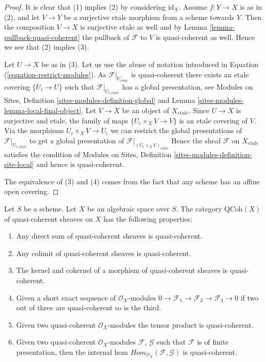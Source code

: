 \begin{proof}
It is clear that (1) implies (2) by considering $\text{id}_X$.
Assume $f : Y \to X$ is as in (2), and let $V \to Y$ be a surjective
etale morphism from a scheme towards $Y$. Then the composition $V \to X$ is
surjective etale as well
and by Lemma \ref{lemma-pullback-quasi-coherent} the pullback of $\mathcal{F}$
to $V$ is quasi-coherent as well. Hence we see that (2) implies (3).

\medskip\noindent
Let $U \to X$ be as in (3). Let us use the abuse of notation introduced
in Equation (\ref{equation-restrict-modules}).
As $\mathcal{F}|_{U_{etale}}$ is quasi-coherent there exists an etale covering
$\{U_i \to U\}$ such that $\mathcal{F}|_{U_{i, etale}}$ has a
global presentation, see
Modules on Sites, Definition \ref{sites-modules-definition-global} and
Lemma \ref{sites-modules-lemma-local-final-object}.
Let $V \to X$ be an object of $X_{etale}$. Since $U \to X$ is surjective and
etale, the family of maps $\{U_i \times_X V \to V\}$ is an etale covering
of $V$. Via the morphisms $U_i \times_X V \to U_i$ we can restrict the
global presentations of $\mathcal{F}|_{U_{i, etale}}$ to get a global
presentation of $\mathcal{F}|_{(U_i \times_X V)_{etale}}$
Hence the sheaf $\mathcal{F}$ on $X_{etale}$ satisfies the condition of
Modules on Sites, Definition \ref{sites-modules-definition-site-local}
and hence is quasi-coherent.

\medskip\noindent
The equivalence of (3) and (4) comes from the fact that any scheme has
an affine open covering.
\end{proof}

\begin{lemma}
\label{lemma-properties-quasi-coherent}
Let $S$ be a scheme. Let $X$ be an algebraic space over $S$.
The category $\text{QCoh}(X)$ of quasi-coherent sheaves on $X$ has
the following properties:
\begin{enumerate}
\item Any direct sum of quasi-coherent sheaves is quasi-coherent.
\item Any colimit of quasi-coherent sheaves is quasi-coherent.
\item The kernel and cokernel of a morphism of quasi-coherent sheaves
is quasi-coherent.
\item Given a short exact sequence of $\mathcal{O}_X$-modules
$0 \to \mathcal{F}_1 \to \mathcal{F}_2 \to \mathcal{F}_3 \to 0$
if two out of three are quasi-coherent so is the third.
\item Given two quasi-coherent $\mathcal{O}_X$-modules
the tensor product is quasi-coherent.
\item Given two quasi-coherent $\mathcal{O}_X$-modules
$\mathcal{F}$, $\mathcal{G}$ such that $\mathcal{F}$
is of finite presentation, then the internal hom
$\textit{Hom}_{\mathcal{O}_X}(\mathcal{F}, \mathcal{G})$
is quasi-coherent.
\end{enumerate}
\end{lemma}

